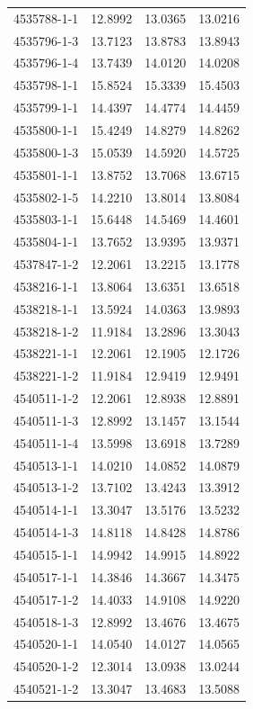 \begin{longtable}{lrrr}
4535788-1-1 & 12.8992 & 13.0365 & 13.0216 \\
4535796-1-3 & 13.7123 & 13.8783 & 13.8943 \\
4535796-1-4 & 13.7439 & 14.0120 & 14.0208 \\
4535798-1-1 & 15.8524 & 15.3339 & 15.4503 \\
4535799-1-1 & 14.4397 & 14.4774 & 14.4459 \\
4535800-1-1 & 15.4249 & 14.8279 & 14.8262 \\
4535800-1-3 & 15.0539 & 14.5920 & 14.5725 \\
4535801-1-1 & 13.8752 & 13.7068 & 13.6715 \\
4535802-1-5 & 14.2210 & 13.8014 & 13.8084 \\
4535803-1-1 & 15.6448 & 14.5469 & 14.4601 \\
4535804-1-1 & 13.7652 & 13.9395 & 13.9371 \\
4537847-1-2 & 12.2061 & 13.2215 & 13.1778 \\
4538216-1-1 & 13.8064 & 13.6351 & 13.6518 \\
4538218-1-1 & 13.5924 & 14.0363 & 13.9893 \\
4538218-1-2 & 11.9184 & 13.2896 & 13.3043 \\
4538221-1-1 & 12.2061 & 12.1905 & 12.1726 \\
4538221-1-2 & 11.9184 & 12.9419 & 12.9491 \\
4540511-1-2 & 12.2061 & 12.8938 & 12.8891 \\
4540511-1-3 & 12.8992 & 13.1457 & 13.1544 \\
4540511-1-4 & 13.5998 & 13.6918 & 13.7289 \\
4540513-1-1 & 14.0210 & 14.0852 & 14.0879 \\
4540513-1-2 & 13.7102 & 13.4243 & 13.3912 \\
4540514-1-1 & 13.3047 & 13.5176 & 13.5232 \\
4540514-1-3 & 14.8118 & 14.8428 & 14.8786 \\
4540515-1-1 & 14.9942 & 14.9915 & 14.8922 \\
4540517-1-1 & 14.3846 & 14.3667 & 14.3475 \\
4540517-1-2 & 14.4033 & 14.9108 & 14.9220 \\
4540518-1-3 & 12.8992 & 13.4676 & 13.4675 \\
4540520-1-1 & 14.0540 & 14.0127 & 14.0565 \\
4540520-1-2 & 12.3014 & 13.0938 & 13.0244 \\
4540521-1-2 & 13.3047 & 13.4683 & 13.5088 \\

\end{longtable}

